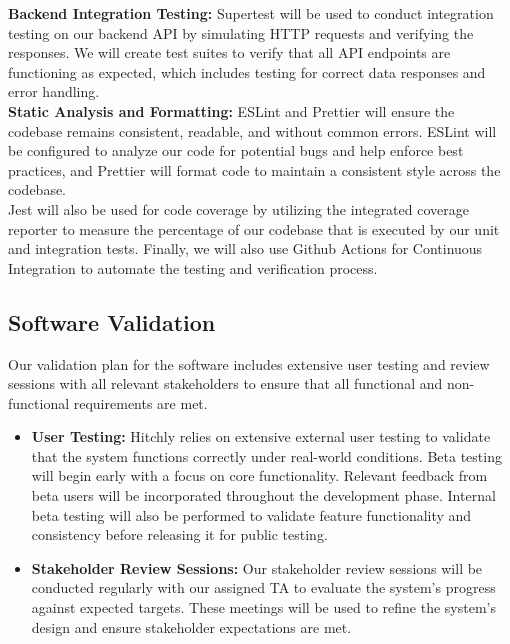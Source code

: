 \documentclass[12pt, titlepage]{article}
\begin{document}
\noindent \textbf{Backend Integration Testing:} Supertest will be used to conduct integration testing on our backend API by simulating HTTP requests and verifying the responses. We will create test suites to verify that all API endpoints are functioning as expected, which includes testing for correct data responses and error handling. \\

\noindent \textbf{Static Analysis and Formatting:} ESLint and Prettier will ensure the codebase remains consistent, readable, and without common errors. ESLint will be configured to analyze our code for potential bugs and help enforce best practices, and Prettier will format code to maintain a consistent style across the codebase. \\

\noindent Jest will also be used for code coverage by utilizing the integrated coverage reporter to measure the percentage of our codebase that is executed by our unit and integration tests. Finally, we will also use Github Actions for Continuous Integration to automate the testing and verification process. \\

\subsection{Software Validation}

Our validation plan for the software includes extensive user testing and review sessions with all relevant stakeholders to ensure that all functional and non-functional requirements are met.

\begin{itemize}
    \item \textbf{User Testing:} 
    Hitchly relies on extensive external user testing to validate that the system functions correctly under real-world conditions. 
    Beta testing will begin early with a focus on core functionality. 
    Relevant feedback from beta users will be incorporated throughout the development phase. 
    Internal beta testing will also be performed to validate feature functionality and consistency before releasing it for public testing.

    \item \textbf{Stakeholder Review Sessions:} 
    Our stakeholder review sessions will be conducted regularly with our assigned TA to evaluate the system's progress against expected targets. 
    These meetings will be used to refine the system’s design and ensure stakeholder expectations are met.
\end{itemize}
\end{document}
